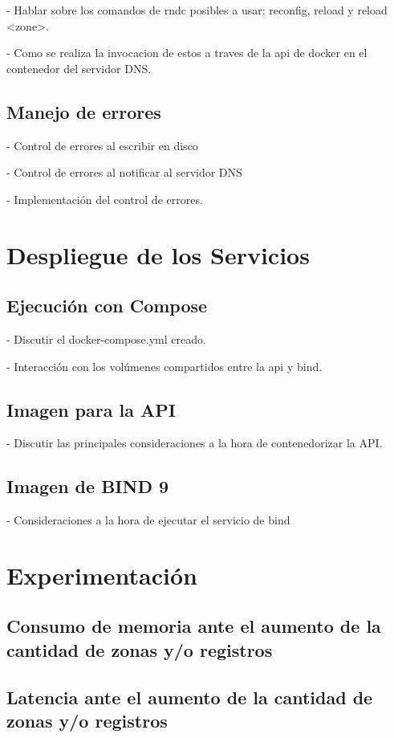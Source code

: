 - Hablar sobre los comandos de rndc posibles a usar: reconfig, reload y reload <zone>.

- Como se realiza la invocacion de estos a traves de la api de docker en el contenedor del servidor DNS.

\subsection{Manejo de errores}

- Control de errores al escribir en disco

- Control de errores al notificar al servidor DNS

- Implementación del control de errores.

\section{Despliegue de los Servicios}

\subsection{Ejecución con Compose}

- Discutir el docker-compose.yml creado.

- Interacción con los volúmenes compartidos entre la api y bind.

\subsection{Imagen para la API}

- Discutir las principales consideraciones a la hora de contenedorizar la API.

\subsection{Imagen de BIND 9}

- Consideraciones a la hora de ejecutar el servicio de bind


\section{Experimentación}

\subsection{Consumo de memoria ante el aumento de la cantidad de zonas y/o registros}

\subsection{Latencia ante el aumento de la cantidad de zonas y/o registros}
